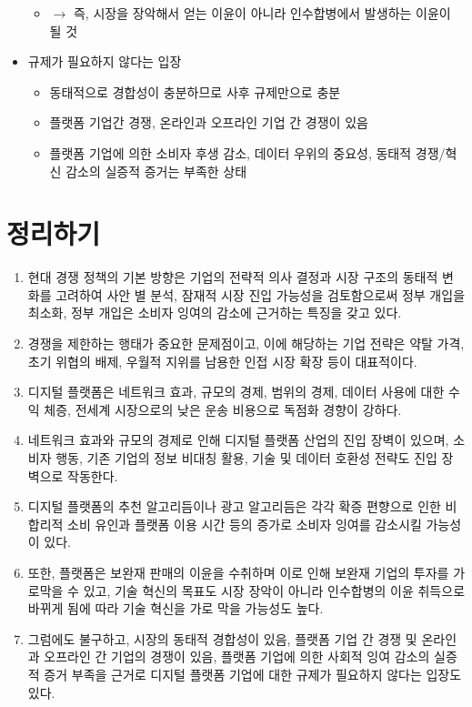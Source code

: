 \begin{itemize}
\begin{itemize}
	\item $\rightarrow$ 즉, 시장을 장악해서 얻는 이윤이 아니라 인수합병에서 발생하는 이윤이 될 것
	\end{itemize}
\item 규제가 필요하지 않다는 입장
	\begin{itemize}
	\item 동태적으로 경합성이 충분하므로 사후 규제만으로 충분
	\item 플랫폼 기업간 경쟁, 온라인과 오프라인 기업 간 경쟁이 있음
	\item 플랫폼 기업에 의한 소비자 후생 감소, 데이터 우위의 중요성, 동태적 경쟁/혁신 감소의 실증적 증거는 부족한 상태 
	\end{itemize}	
\end{itemize}


\pagebreak

\section*{정리하기}
\begin{enumerate}
\item 현대 경쟁 정책의 기본 방향은 기업의 전략적 의사 결정과 시장 구조의 동태적 변화를 고려하여 사안 별 분석, 잠재적 시장 진입 가능성을 검토함으로써 정부 개입을 최소화, 정부 개입은 소비자 잉여의 감소에 근거하는 특징을 갖고 있다.
\item 경쟁을 제한하는 행태가 중요한 문제점이고, 이에 해당하는 기업 전략은 약탈 가격, 초기 위협의 배제, 우월적 지위를 남용한 인접 시장 확장 등이 대표적이다.
\item 디지털 플랫폼은 네트워크 효과, 규모의 경제, 범위의 경제, 데이터 사용에 대한 수익 체증, 전세계 시장으로의 낮은 운송 비용으로 독점화 경향이 강하다.
\item 네트워크 효과와 규모의 경제로 인해 디지털 플랫폼 산업의 진입 장벽이 있으며, 소비자 행동, 기존 기업의 정보 비대칭 활용, 기술 및 데이터 호환성 전략도 진입 장벽으로 작동한다.
\item 디지털 플랫폼의 추천 알고리듬이나 광고 알고리듬은 각각 확증 편향으로 인한 비합리적 소비 유인과 플랫폼 이용 시간 등의 증가로 소비자 잉여를 감소시킬 가능성이 있다.
\item 또한, 플랫폼은 보완재 판매의 이윤을 수취하며 이로 인해 보완재 기업의 투자를 가로막을 수 있고, 기술 혁신의 목표도 시장 장악이 아니라 인수합병의 이윤 취득으로 바뀌게 됨에 따라 기술 혁신을 가로 막을 가능성도 높다. 
\item 그럼에도 불구하고, 시장의 동태적 경합성이 있음, 플랫폼 기업 간 경쟁 및 온라인과 오프라인 간 기업의 경쟁이 있음, 플랫폼 기업에 의한 사회적 잉여 감소의 실증적 증거 부족을 근거로 디지털 플랫폼 기업에 대한 규제가 필요하지 않다는 입장도 있다.
\end{enumerate}
